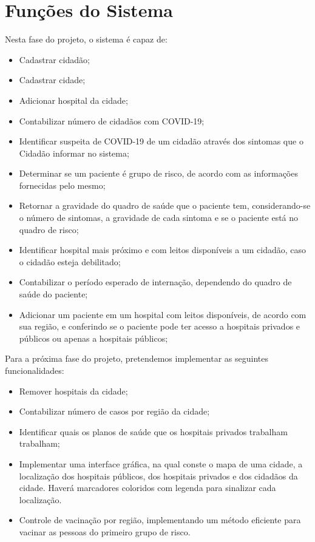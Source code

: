 \documentclass[10pt]{article}
\begin{document}
\section{Funções do Sistema}
Nesta fase do projeto, o sistema é capaz de:
\begin{itemize}
\item Cadastrar cidadão;
\item Cadastrar cidade;
\item Adicionar hospital da cidade;
\item Contabilizar número de cidadãos com COVID-19;
\item Identificar suspeita de COVID-19 de um cidadão através dos sintomas que o Cidadão informar no sistema;
\item Determinar se um paciente é grupo de risco, de acordo com as informações fornecidas pelo mesmo;
\item Retornar a gravidade do quadro de saúde que o paciente tem, considerando-se o número de sintomas, a gravidade de cada sintoma e se o paciente está no quadro de risco;
\item Identificar hospital mais próximo e com leitos disponíveis a um cidadão, caso o cidadão esteja debilitado;
\item Contabilizar o período esperado de internação, dependendo do quadro de saúde do paciente;
\item Adicionar um paciente em um hospital com leitos disponíveis, de acordo com sua região, e conferindo se o paciente pode ter acesso a hospitais privados e públicos ou apenas a hospitais públicos;
\end{itemize}

Para a próxima fase do projeto, pretendemos implementar as seguintes funcionalidades:
\begin{itemize}
\item Remover hospitais da cidade;
\item Contabilizar número de casos por região da cidade;
\item Identificar quais os planos de saúde que os hospitais privados trabalham trabalham;
\item Implementar uma interface gráfica, na qual conste o mapa de uma cidade, a localização dos hospitais públicos, dos hospitais privados e dos cidadãos da cidade. Haverá marcadores coloridos com legenda para sinalizar cada localização. 
\item Controle de vacinação por região, implementando um método eficiente para vacinar as pessoas do primeiro grupo de risco. 
\end{itemize}
\end{document}
